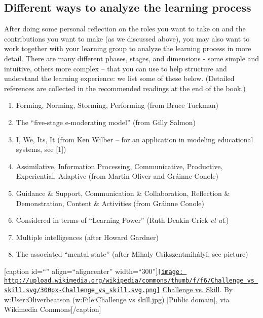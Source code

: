 \subsection{Different ways to analyze the learning process}

After doing some personal reflection on the roles you want to take on
and the contributions you want to make (as we discussed above), you may
also want to work together with your learning group to analyze the
learning process in more detail. There are many different phases,
stages, and dimensions - some simple and intuitive, others more complex
-- that you can use to help structure and understand the learning
experience: we list some of these below. (Detailed references are
collected in the recommended readings at the end of the book.)

\begin{enumerate}
\itemsep1pt\parskip0pt
\item
  Forming, Norming, Storming, Performing (from Bruce Tuckman)
\item
  The ``five-stage e-moderating model'' (from Gilly Salmon)
\item
  I, We, Its, It (from Ken Wilber -- for an application in modeling
  educational systems, see {[}1{]})
\item
  Assimilative, Information Processing, Communicative, Productive,
  Experiential, Adaptive (from Martin Oliver and Gráinne Conole)
\item
  Guidance \& Support, Communication \& Collaboration, Reflection \&
  Demonstration, Content \& Activities (from Gráinne Conole)
\item
  Considered in terms of ``Learning Power'' (Ruth Deakin-Crick \emph{et
  al}.)
\item
  Multiple intelligences (after Howard Gardner)
\item
  The associated ``mental state'' (after Mihaly Csíkszentmihályi; see
  picture)
\end{enumerate}

{[}caption id=``'' align=``aligncenter''
width=``300''{]}\href{http://commons.wikimedia.org/wiki/File\%3AChallenge_vs_skill.svg}{\texttt{[image: http://upload.wikimedia.org/wikipedia/commons/thumb/f/f6/Challenge\_vs\_skill.svg/300px-Challenge\_vs\_skill.svg.png]}}
\href{http://commons.wikimedia.org/wiki/File\%3AChallenge_vs_skill.svg}{Challenge
vs. Skill}. By w:User:Oliverbeatson (w:File:Challenge vs skill.jpg)
{[}Public domain{]}, via Wikimedia Commons{[}/caption{]}

